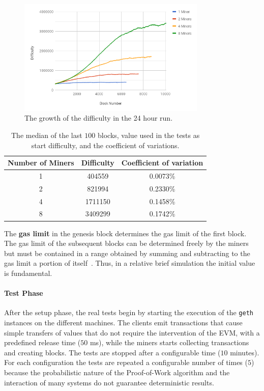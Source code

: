 \begin{figure}[h!]
  \begin{center}
    \includegraphics[width=0.8\textwidth]{./res/img/start_difficulty_all.png}
    \caption{The growth of the difficulty in the 24 hour run.}
    \label{fig:start_difficulty_raw}
  \end{center}
\end{figure}

\begin{table}[h!]
  \begin{center}
    \begin{tabular}{c | c | c}
      Number of Miners & Difficulty & Coefficient of variation \\
      \hline
      1 &  404559 & 0.0073\% \\
      2 &  821994 & 0.2330\%\\
      4 & 1711150 & 0.1458\%\\
      8 & 3409299 & 0.1742\%\\
    \end{tabular}
    \caption{The median of the last $100$ blocks, value used in the tests as
    start difficulty, and the coefficient of variations.}
    \label{table:start-difficulty}
  \end{center}
\end{table}


The \textbf{gas limit} in the genesis block determines the gas limit of the
first block. The gas limit of the subsequent blocks can be determined freely by
the miners but must be contained in a range obtained by summing and subtracting
to the gas limit a portion of itself~\cite{wood2018ethereum}. Thus, in a
relative brief simulation the initial value is fundamental.

\paragraph{Test Phase}
After the setup phase, the real tests begin by starting the execution of the
\texttt{geth} instances on the different machines. The clients emit transactions
that cause simple transfers of values that do not require the intervention of
the EVM, with a predefined release time ($50$ ms), while the miners starts
collecting transactions and creating blocks. The tests are stopped after a
configurable time ($10$ minutes). For each configuration the tests are repeated
a configurable number of times ($5$) because the probabilistic nature of the
Proof-of-Work algorithm and the interaction of many systems do not guarantee
deterministic results.


